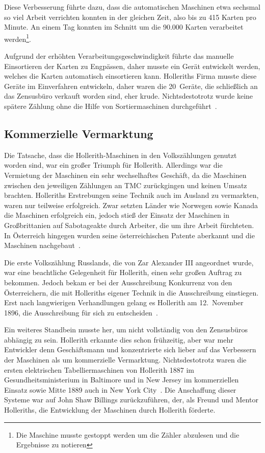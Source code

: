 \documentclass[parskip=half]{scrartcl}
\begin{document}
Diese Verbesserung führte dazu, dass die automatischen Maschinen etwa sechsmal
so viel Arbeit verrichten konnten in der gleichen Zeit, also bis zu 415 Karten
pro Minute. An einem Tag konnten im Schnitt um die 90.000 Karten verarbeitet
werden\footnote{Die Maschine musste gestoppt werden um die Zähler abzulesen und
die Ergebnisse zu notieren}.

Aufgrund der erhöhten Verarbeitungsgeschwindigkeit führte das manuelle
Einsortieren der Karten zu Engpässen, daher musste ein Gerät entwickelt werden,
welches die Karten automatisch einsortieren kann. Holleriths Firma musste diese
Geräte im Einverfahren entwickeln, daher waren die 20~Geräte, die schließlich an
das Zensusbüro verkauft worden sind, eher krude. Nichtsdestotrotz wurde keine
spätere Zählung ohne die Hilfe von Sortiermaschinen
durchgeführt~\cite{truesdell1965development}.

\subsection{Kommerzielle Vermarktung}
\label{sec:commerce}

Die Tatsache, dass die Hollerith-Maschinen in den Volkszählungen genutzt worden
sind, war ein großer Triumph für Hollerith. Allerdings war die Vermietung der
Maschinen ein sehr wechselhaftes Geschäft, da die Maschinen zwischen den
jeweiligen Zählungen an TMC zurückgingen und keinen Umsatz brachten.
Holleriths Erstrebungen seine Technik auch im Ausland zu vermarkten, waren nur
teilweise erfolgreich. Zwar setzten Länder wie Norwegen sowie Kanada die
Maschinen erfolgreich ein, jedoch stieß der Einsatz der Maschinen in
Großbrittanien auf Sabotageakte durch Arbeiter, die um ihre Arbeit fürchteten.
In Österreich hingegen wurden seine österreichischen Patente aberkannt und die Maschinen
nachgebaut~\cite{austrian1982herman}.

Die erste Volkszählung Russlands, die von Zar Alexander III angeordnet wurde, war
eine beachtliche Gelegenheit für Hollerith, einen sehr großen Auftrag zu
bekommen. Jedoch bekam er bei der Ausschreibung Konkurrenz von den
Österreichern, die mit Holleriths eigener Technik in die Ausschreibung
einstiegen. Erst nach langwierigen Verhandlungen gelang es Hollerith am
12.~November 1896, die Ausschreibung für sich zu entscheiden~\cite{austrian1982herman}.

Ein weiteres Standbein musste her, um nicht vollständig von den Zensusbüros
abhängig zu sein. Hollerith erkannte dies schon frühzeitig, aber war mehr
Entwickler denn Geschäftsmann und konzentrierte sich lieber auf das Verbessern
der Maschinen als um kommerzielle Vermarktung. Nichtsdestotrotz waren die
ersten elektrischen Tabelliermaschinen von Hollerith 1887 im Gesundheitsministerium in Baltimore und in New Jersey im kommerziellen Einsatz sowie Mitte 1889 auch
in New York City~\cite{austrian1982herman}. Die Anschaffung dieser Systeme war
auf John Shaw Billings zurückzuführen, der, als Freund und Mentor Holleriths,
die Entwicklung der Maschinen durch Hollerith förderte.
\end{document}
